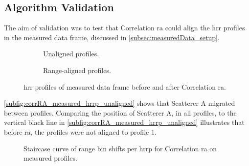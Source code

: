 \documentclass[class=report,11pt,crop=false]{standalone}
\begin{document}
    \subsection{Algorithm Validation}
    The aim of validation was to test that Correlation \gls{ra} could align the \gls{hrr} profiles in the measured data frame, discussed in \autoref{subsec:measuredData_setup}.
    
    \begin{figure}[h]
        \centering
        \begin{subfigure}{0.4\linewidth}
                \centering
                \resizebox{\linewidth}{!}{}
                \caption{Unaligned profiles.\label{subfig:corrRA_measured_hrrp_unaligned}}
        \end{subfigure}
        \hspace{1cm}
        \begin{subfigure}{0.4\linewidth}
                \centering
                \resizebox{\linewidth}{!}{}
                \caption{Range-aligned profiles.\label{subfig:corrRA_measureed_hrrp}}
        \end{subfigure}
        \caption{\gls{hrr} profiles of measured data frame before and after Correlation \gls{ra}. \label{fig:corrRA_measured}}
    \end{figure}

    \autoref{subfig:corrRA_measured_hrrp_unaligned} shows that Scatterer A migrated between profiles. Comparing the position of Scatterer A, in all profiles, to the vertical black line in \autoref{subfig:corrRA_measured_hrrp_unaligned} illustrates that before \gls{ra}, the profiles were not aligned to profile 1.
    
    \begin{figure}
        \centering
        \resizebox{0.45\linewidth}{!}{}
        \caption{Staircase curve of range bin shifts per \gls{hrrp} for Correlation \gls{ra} on measured profiles.}\label{fig:corrRA_Measured_shifts}
    \end{figure}
    
\end{document}
